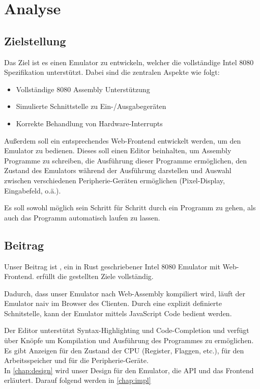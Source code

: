 \chapter{Analyse}

\section{Zielstellung}\label{goals}

Das Ziel ist es einen Emulator zu entwickeln, welcher die vollständige Intel 8080 Spezifikation\cite{datasheet} unterstützt. Dabei sind die zentralen Aspekte wie folgt:

\begin{itemize}
    \item Vollständige 8080 Assembly Unterstützung
    \item Simulierte Schnittstelle zu Ein-/Ausgabegeräten
    \item Korrekte Behandlung von Hardware-Interrupts
\end{itemize}



Außerdem soll ein entsprechendes Web-Frontend entwickelt werden, um den Emulator zu bedienen.
Dieses soll einen Editor beinhalten, um Assembly Programme zu schreiben, die Ausführung dieser Programme ermöglichen, den Zustand des Emulators während der Ausführung darstellen und Auswahl zwischen verschiedenen Peripherie-Geräten ermöglichen (Pixel-Display, Eingabefeld, o.ä.). 

Es soll sowohl möglich sein Schritt für Schritt durch ein Programm zu gehen, als auch das Programm automatisch laufen zu lassen.

\section{Beitrag}

Unser Beitrag ist \Emu, ein in Rust geschriebener Intel 8080 Emulator mit Web-Frontend. \Emu erfüllt die gestellten Ziele vollständig.

Dadurch, dass unser Emulator nach Web-Assembly kompiliert wird, läuft der Emulator naiv im Browser des Clienten. Durch eine explizit definierte Schnitstelle, kann der Emulator mittels JavaScript Code bedient werden.

Der Editor unterstützt Syntax-Highlighting und Code-Completion und verfügt über Knöpfe um Kompilation und Ausführung des Programmes zu ermöglichen.
Es gibt Anzeigen für den Zustand der CPU (Register, Flaggen, etc.), für den Arbeitsspeicher und für die Peripherie-Geräte.\\

In \cref{chap:design} wird unser Design für den Emulator, die API und das Frontend
erläutert. Darauf folgend werden in \cref{chap:impl}
